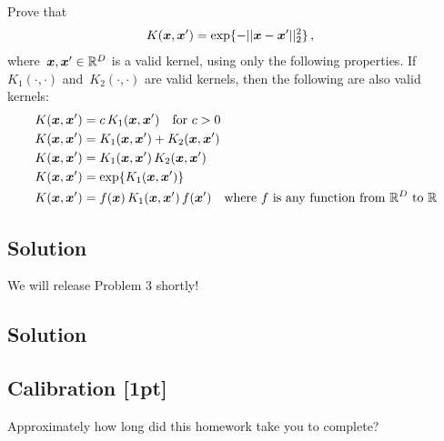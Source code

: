 \documentclass[submit]{harvardml}
\begin{document}
\newpage
\begin{problem}
Prove that
\begin{align*}
	K(\boldsymbol{x}, \boldsymbol{x}') &= \exp\{ -||\boldsymbol{x} - \boldsymbol{x}'||^2_2 \}\,,
\end{align*}
where~$\boldsymbol{x},\boldsymbol{x}'\in\mathbb{R}^D$ is a valid kernel, using only the following
properties.  If~$K_1(\cdot,\cdot)$ and~$K_2(\cdot,\cdot)$ are valid kernels,
then the following are also valid kernels:
\begin{align*}
	K(\boldsymbol{x}, \boldsymbol{x}') &= c\,K_1(\boldsymbol{x}, \boldsymbol{x}') \quad \text{for $c>0$}\\
	K(\boldsymbol{x}, \boldsymbol{x}') &= K_1(\boldsymbol{x}, \boldsymbol{x}') + K_2(\boldsymbol{x}, \boldsymbol{x}')\\
	K(\boldsymbol{x}, \boldsymbol{x}') &= K_1(\boldsymbol{x}, \boldsymbol{x}')\,K_2(\boldsymbol{x}, \boldsymbol{x}')\\
	K(\boldsymbol{x}, \boldsymbol{x}') &= \exp\{ K_1(\boldsymbol{x}, \boldsymbol{x}') \}\\
  K(\boldsymbol{x}, \boldsymbol{x}') &= f(\boldsymbol{x})\,K_1(\boldsymbol{x}, \boldsymbol{x}')\,f(\boldsymbol{x}') \quad
  \text{where $f$ is any function from~$\mathbb{R}^D$ to $\mathbb{R}$}
\end{align*}

 \end{problem}
\subsection*{Solution}


\newpage
\begin{problem}
We will release Problem 3 shortly!
\end{problem}

\subsection*{Solution}



\newpage

\subsection*{Calibration [1pt]}
Approximately how long did this homework take you to complete?
\end{document}
